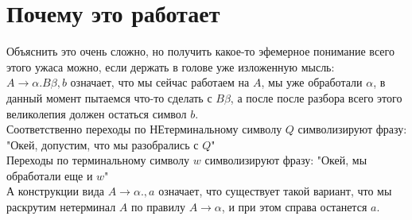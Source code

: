 \documentclass[14pt]{extreport}
\begin{document}
	\section{Почему это работает}
	Объяснить это очень сложно, но получить какое-то эфемерное понимание всего этого ужаса можно,
	если держать в голове уже изложенную мысль:\\
	$A \to \alpha . B \beta , b$ означает, что мы сейчас работаем на $A$, мы уже обработали
	$\alpha$, в данный момент пытаемся что-то сделать с $B \beta$, а после после разбора всего
	этого великолепия должен остаться символ $b$.\\
	Соответственно переходы по НЕтерминальному символу $Q$ символизируют фразу:
	"Окей, допустим, что мы разобрались с $Q$"\\
	Переходы по терминальному символу $w$ символизируют фразу: "Окей, мы обработали еще и $w$"\\
	А конструкции вида $A \to \alpha ., a$ означает, что существует такой вариант, что
	мы раскрутим нетерминал $A$ по правилу $A \to \alpha$, и при этом справа останется $a$.\\\\
\end{document}

